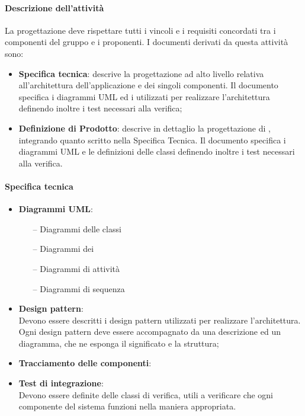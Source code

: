  \paragraph{Descrizione dell'attività}
La progettazione deve rispettare tutti i vincoli e i requisiti concordati tra i componenti del gruppo
e i proponenti. I documenti derivati da questa attività sono:
\begin{itemize}
	\item \textbf{Specifica tecnica}: descrive la progettazione ad alto livello relativa all'architettura dell'applicazione
e dei singoli componenti. Il documento specifica i diagrammi UML ed i  utilizzati per realizzare l'architettura definendo inoltre i test necessari alla verifica;
	\item \textbf{Definizione di Prodotto}: descrive in dettaglio la progettazione di , integrando
quanto scritto nella Specifica Tecnica. Il documento specifica i diagrammi UML e le
definizioni delle classi definendo inoltre i test necessari alla verifica.
\end{itemize}
 \paragraph{Specifica tecnica}
\begin{itemize} 
	\item \textbf{Diagrammi UML}:
	\begin{itemize}
	\item[--] Diagrammi delle classi
	\item[--] Diagrammi dei 
	\item[--] Diagrammi di attività
	\item[--] Diagrammi di sequenza
	\end{itemize}
	\item \textbf{Design pattern}:\\	Devono essere descritti i design pattern utilizzati per realizzare l'architettura. Ogni design
pattern deve essere accompagnato da una descrizione ed un diagramma, che ne esponga il
significato e la struttura;
	\item \textbf{Tracciamento delle componenti}:
	\item \textbf{Test di integrazione}:\\	Devono essere definite delle classi di verifica, utili a verificare che ogni componente del
sistema funzioni nella maniera appropriata.
\end{itemize}
